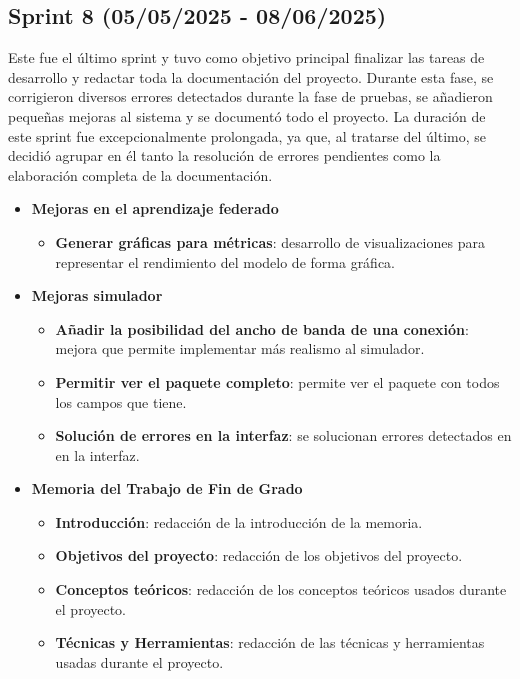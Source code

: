 \subsection{Sprint 8 (05/05/2025 - 08/06/2025)}
\label{subsec:OctavoSprint}
Este fue el último sprint y tuvo como objetivo principal finalizar las tareas de desarrollo y redactar toda la documentación del proyecto. Durante esta fase, se corrigieron diversos errores detectados durante la fase de pruebas, se añadieron pequeñas mejoras al sistema y se documentó todo el proyecto. La duración de este sprint fue excepcionalmente prolongada, ya que, al tratarse del último, se decidió agrupar en él tanto la resolución de errores pendientes como la elaboración completa de la documentación.

\begin{itemize}
    \item \textbf{Mejoras en el aprendizaje federado}
    \begin{itemize}
        \item \textbf{Generar gráficas para métricas}: desarrollo de visualizaciones para representar el rendimiento del modelo de forma gráfica.
    \end{itemize}
    \item \textbf{Mejoras simulador}
    \begin{itemize}
        \item \textbf{Añadir la posibilidad del ancho de banda de una conexión}: mejora que permite implementar más realismo al simulador.
        \item \textbf{Permitir ver el paquete completo}: permite ver el paquete con todos los campos que tiene.
        \item \textbf{Solución de errores en la interfaz}: se solucionan errores detectados en en la interfaz.
    \end{itemize}
    \item \textbf{Memoria del Trabajo de Fin de Grado}
    \begin{itemize}
        \item \textbf{Introducción}: redacción de la introducción de la memoria.
        \item \textbf{Objetivos del proyecto}: redacción de los objetivos del proyecto.
        \item \textbf{Conceptos teóricos}: redacción de los conceptos teóricos usados durante el proyecto.
        \item \textbf{Técnicas y Herramientas}: redacción de las técnicas y herramientas usadas durante el proyecto.

\end{itemize}
\end{itemize}
